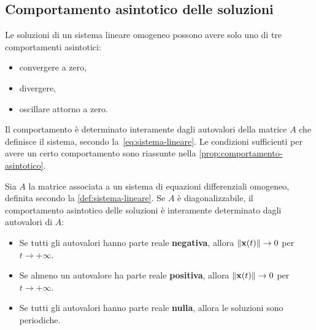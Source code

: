 \subsection{Comportamento asintotico delle soluzioni}
\label{subsec:comportamento-asintotico}
Le soluzioni di un sistema lineare omogeneo possono avere solo uno di tre comportamenti asintotici:
\begin{itemize}
    \item convergere a zero,
    \item divergere,
    \item oscillare attorno a zero.
\end{itemize}
Il comportamento è determinato interamente dagli autovalori della matrice $A$ che definisce il
sistema, secondo la~\eqref{eq:sistema-lineare}.
Le condizioni sufficienti per avere un certo comportamento sono riassunte nella \autoref{prop:comportamento-asintotico}.
\begin{prop}
    Sia $A$ la matrice associata a un sistema di equazioni differenziali omogeneo,
    definita secondo la \autoref{def:sistema-lineare}.
    Se $A$ è diagonalizzabile, il comportamento asintotico delle soluzioni è interamente
    determinato dagli autovalori di $A$:
    \begin{itemize}
        \item Se tutti gli autovalori hanno parte reale \textbf{negativa}, allora $\lVert\mathbf{x}(t)\rVert \to 0$ per $t \to +\infty$.%
        \item Se almeno un autovalore ha parte reale \textbf{positiva}, allora $\lVert\mathbf{x}(t)\rVert \to 0$ per $t \to +\infty$.%
        \item Se tutti gli autovalori hanno parte reale \textbf{nulla}, allora le soluzioni sono periodiche.
    \end{itemize}
    \label{prop:comportamento-asintotico}
\end{prop}

